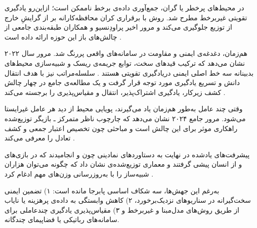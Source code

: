 در محیط‌های پرخطر یا گران، جمع‌آوری داده‌ی برخط ناممکن است؛ ازاین‌رو یادگیری تقویتی غیربرخط مطرح شد. روش  با برقراری کران محافظه‌کارانه بر  از گرایشِ خارج از توزیع جلوگیری می‌کند \cite{Kumar2020CQL} و مرور اخیر پراودِنسیو و همکاران طبقه‌بندی جامعی از چالش‌های باز این حوزه ارائه داده است \cite{Prudencio2022OfflineSurvey}. %


هم‌زمان، دغدغه‌ی ایمنی و مقاومت در سامانه‌های واقعی پررنگ شد. مرور سال ۲۰۲۲ نشان می‌دهد که ترکیب قیدهای سخت، توابع جریمه‌ی ریسک و شبیه‌سازی محیط‌های بدبینانه سه خط اصلی ایمنی دریادگیری تقویتی هستند \cite{JMLR:v16:garcia15a}. سلسله‌مراتب نیز با هدف انتقال دانش و تسریع یادگیری مورد توجه قرار گرفت و یک مطالعه‌ی جامع در 
 چهار چالش کشف زیرکار، یادگیری اشتراک‌پذیر، انتقال و مقیاس‌پذیری را برجسته می‌کند \cite{Ghazalpour2021HRLsurvey}. %


وقتی چند عامل به‌طور هم‌زمان یاد می‌گیرند، پویایی محیط از دید هر عامل غیرایستا می‌شود. مرور جامع ۲۰۲۴ نشان می‌دهد که چارچوب ناظر متمرکز ـ بازیگر توزیع‌شده
 راهکاری موثر برای این چالش است و مباحثی چون تخصیص اعتبار جمعی و کشف تعادل را معرفی می‌کند \cite{Song2024MARLsurvey}. %


پیشرفت‌های یادشده در نهایت به دستاوردهای نمادینی چون  \cite{Silver2016AlphaGo} و  \cite{Vinyals2019AlphaStar} انجامیدند که در بازی‌های  و  از انسان پیشی گرفتند و معماری توزیع‌شده‌ی  نشان داد که چگونه می‌توان هزاران شبیه‌ساز را با به‌روزرسانی وزن‌های مهم ادغام کرد \cite{Espeholt2018IMPALA}. %


به‌رغم این جهش‌ها، سه شکاف اساسی پابرجا مانده است: ۱) تضمین ایمنی سخت‌گیرانه در سناریوهای نزدیک‌برخورد، ۲) کاهش وابستگی به داده‌ی پرهزینه یا نایاب از طریق روش‌های مدل‌مبنا و غیربرخط و ۳) مقیاس‌پذیری یادگیری چندعاملی برای سامانه‌های رباتیکی یا فضاپیمای چندگانه. 
